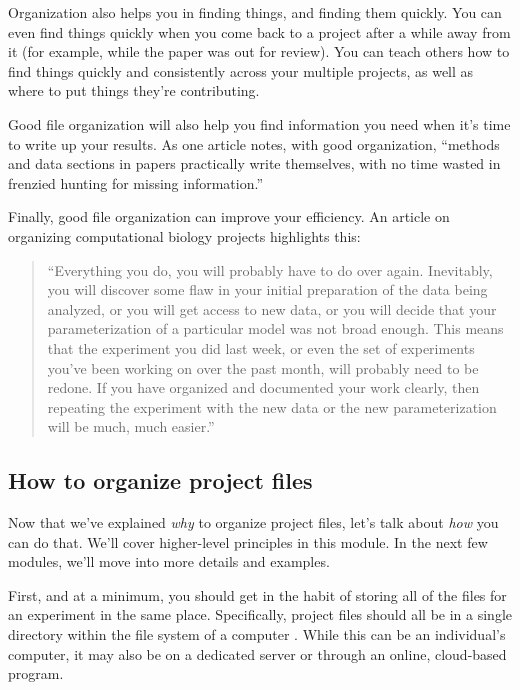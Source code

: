 \documentclass[]{tufte-book}
\begin{document}
Organization also helps you in finding things, and finding them quickly. You can
even find things quickly when you come back to a project after a while away from
it (for example, while the paper was out for review). You can teach others how
to find things quickly and consistently across your multiple projects, as well
as where to put things they're contributing.

Good file organization will also help you find information you need when it's
time to write up your results. As one article notes, with good organization,
``methods and data sections in papers practically write themselves, with no time
wasted in frenzied hunting for missing information.'' \citep{baker2016quality}

Finally, good file organization can improve your efficiency. An article on
organizing computational biology projects highlights this:

\begin{quote}
``Everything you do, you will probably have to do over again. Inevitably, you
will discover some flaw in your initial preparation of the data being analyzed,
or you will get access to new data, or you will decide that your
parameterization of a particular model was not broad enough. This means that the
experiment you did last week, or even the set of experiments you've been working
on over the past month, will probably need to be redone. If you have organized
and documented your work clearly, then repeating the experiment with the new
data or the new parameterization will be much, much easier.'' \citep{noble2009quick}
\end{quote}

\subsection{How to organize project files}\label{how-to-organize-project-files}

Now that we've explained \emph{why} to organize project files, let's talk about
\emph{how} you can do that. We'll cover higher-level principles in this
module. In the next few modules, we'll move into more details and examples.

First, and at a minimum, you should get in the habit of storing all of the files
for an experiment in the same place. Specifically, project files should all be
in a single directory within the file system of a computer \citep{noble2009quick, buffalo2015bioinformatics}. While this can be an individual's computer, it may
also be on a dedicated server or through an online, cloud-based program.
\end{document}
